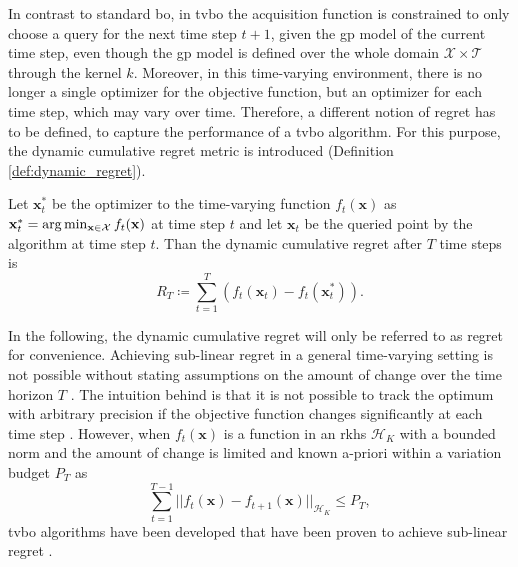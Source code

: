 In contrast to standard \gls{bo}, in \gls{tvbo} the acquisition function is constrained to only choose a query for the next time step $t+1$, given the \gls{gp} model of the current time step, even though the \gls{gp} model is defined over the whole domain $\mathcal{X}\times\mathcal{T}$ through the kernel $k$. Moreover, in this time-varying environment, there is no longer a single optimizer for the objective function, but an optimizer for each time step, which may vary over time. Therefore, a different notion of regret has to be defined, to capture the performance of a \gls{tvbo} algorithm. For this purpose, the dynamic cumulative regret metric is introduced (Definition \ref{def:dynamic_regret}).
\begin{definition}
Let $\mathbf{x}_t^*$ be the optimizer to the time-varying function $f_t(\mathbf{x})$ as $\mathbf{x}_t^* = \arg\min_{\mathbf{x} \in \mathcal{X}} f_t(\mathbf{x})$ at time step $t$ and let $\mathbf{x}_t$ be the queried point by the algorithm at time step $t$. Than the dynamic cumulative regret after $T$ time steps is
\begin{equation}
    R_T \coloneqq \sum_{t=1}^T (f_t(\mathbf{x}_t) - f_t(\mathbf{x}_t^*)).
\end{equation}
\label{def:dynamic_regret}
\end{definition}
\vspace{-0.5cm}
In the following, the dynamic cumulative regret will only be referred to as regret for convenience. Achieving sub-linear regret in a general time-varying setting is not possible without stating assumptions on the amount of change over the time horizon $T$ \cite{Besbes_2015}. The intuition behind is that it is not possible to track the optimum with arbitrary precision if the objective function changes significantly at each time step \cite{Bogunovic_2016}. However, when $f_t(\mathbf{x})$ is a function in an \gls{rkhs} $\mathcal{H}_K$ with a bounded norm and the amount of change is limited and known a-priori within a variation budget $P_T$ \cite{Besbes_2014} as
\begin{equation}
    \sum_{t=1}^{T-1} ||f_t(\mathbf{x}) - f_{t+1}(\mathbf{x})||_{\mathcal{H}_K} \leq P_T,
\end{equation}
\gls{tvbo} algorithms have been developed that have been proven to achieve sub-linear regret \cite{Zhou_2021}.